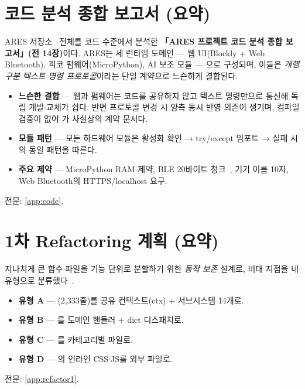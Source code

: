 \section{코드 분석 종합 보고서 (요약)}
ARES 저장소~\cite{ares-repo} 전체를 코드 수준에서 분석한 \textbf{「ARES 프로젝트
코드 분석 종합 보고서」(전 14장)}이다. ARES는 세 런타임 도메인 — 웹 UI(Blockly +
Web Bluetooth), 피코 펌웨어(MicroPython), AI 보조 모듈 — 으로 구성되며, 이들은
\emph{개행 구분 텍스트 명령 프로토콜}이라는 단일 계약으로 느슨하게 결합된다.

\begin{itemize}
  \item \textbf{느슨한 결합} — 웹과 펌웨어는 코드를 공유하지 않고 텍스트 명령만으로
  통신해 독립 개발$\cdot$교체가 쉽다. 반면 프로토콜 변경 시 양측 동시 반영 의존이 생기며,
  컴파일 검증이 없어 가 사실상의 계약 문서다.
  \item \textbf{모듈 패턴} — 모든 하드웨어 모듈은 활성화 확인 → try/except 임포트 →
  실패 시 의 동일 패턴을 따른다.
  \item \textbf{주요 제약} — MicroPython RAM 제약, BLE 20바이트 청크~\cite{bluetooth54}, 기기 이름 10자,
  Web Bluetooth의 HTTPS/localhost 요구.
\end{itemize}
\noindent 전문: \ref{app:code}.

\section{1차 Refactoring 계획 (요약)}
지나치게 큰 함수$\cdot$파일을 기능 단위로 분할하기 위한 \emph{동작 보존} 설계로,
비대 지점을 네 유형으로 분류했다~\cite{fowler2018refactoring, martin2008cleancode, feathers2004legacy, gof1994, mcconnell2004codecomplete, hunt1999pragmatic}.

\smallskip
\noindent{}   

\begin{itemize}
  \item \textbf{유형 A} — (2,333줄)를 공유 컨텍스트(ctx) +
  서브시스템 14개로.
  \item \textbf{유형 B} — 를 도메인 핸들러 + dict 디스패치로.
  \item \textbf{유형 C} — 를 카테고리별 파일로.
  \item \textbf{유형 D} — 의 인라인 CSS$\cdot$JS를 외부 파일로.
\end{itemize}
\noindent 전문: \ref{app:refactor1}.

